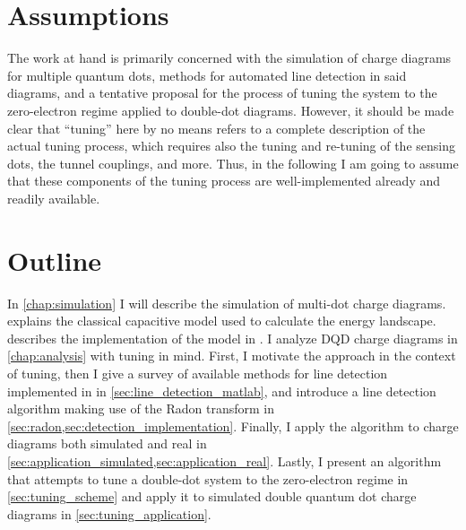 \section{Assumptions}
The work at hand is primarily concerned with the simulation of charge diagrams for multiple quantum dots, methods for automated line detection in said diagrams, and a tentative proposal for the process of tuning the system to the zero-electron regime applied to double-dot diagrams. However, it should be made clear that \enquote{tuning} here by no means refers to a complete description of the actual tuning process, which requires also the tuning and re-tuning of the sensing dots, the tunnel couplings, and more. Thus, in the following I am going to assume that these components of the tuning process are well-implemented already and readily available.

\section{Outline}
In \cref{chap:simulation} I will describe the simulation of multi-dot charge diagrams.  explains the classical capacitive model used to calculate the energy landscape.  describes the implementation of the model in \matlab{}. I analyze DQD charge diagrams in \cref{chap:analysis} with tuning in mind. First, I motivate the approach in the context of tuning, then I give a survey of available methods for line detection implemented in \matlab{} in \cref{sec:line_detection_matlab}, and introduce a line detection algorithm making use of the Radon transform in \cref{sec:radon,sec:detection_implementation}. Finally, I apply the algorithm to charge diagrams both simulated and real in \cref{sec:application_simulated,sec:application_real}. Lastly, I present an algorithm that attempts to tune a double-dot system to the zero-electron regime in \cref{sec:tuning_scheme} and apply it to simulated double quantum dot charge diagrams in \cref{sec:tuning_application}.
